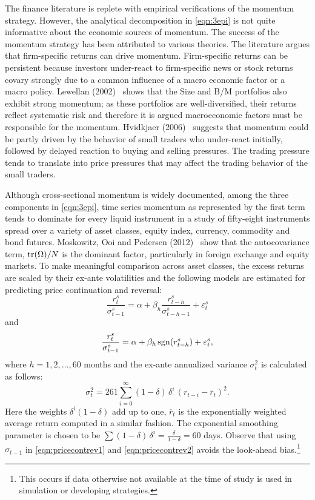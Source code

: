The finance literature is replete with empirical verifications of the momentum strategy. However, the analytical decomposition in \eqref{eqn:3epi} is not quite informative about the economic sources of momentum. The success of the momentum strategy has been attributed to various theories. The literature argues that firm-specific returns can drive momentum. Firm-specific returns can be persistent because investors under-react to firm-specific news or stock returns covary strongly due to a common influence of a macro economic factor or a macro policy. Lewellan (2002)~\cite{lew2002} shows that the Size and B/M portfolios also exhibit strong momentum; as these portfolios are well-diversified, their returns reflect systematic risk and therefore it is argued macroeconomic factors must be responsible for the momentum. Hvidkjaer (2006)~\cite{hvid2006} suggests that momentum could be partly driven by the behavior of small traders who under-react initially, followed by delayed reaction to buying and selling pressures. The trading pressure tends to translate into price pressures that may affect the trading behavior of the small traders.


Although cross-sectional momentum is widely documented, among the three components in \eqref{eqn:3epi}, time series momentum as represented by the first term tends to dominate for every liquid instrument in a study of fifty-eight instruments spread over a variety of asset classes, equity index, currency, commodity and bond futures. Moskowitz, Ooi and Pedersen (2012)~\cite{mos2012} show that the autocovariance term, $\operatorname{tr}(\Omega)/N$ is the dominant factor, particularly in foreign exchange and equity markets. To make meaningful comparison across asset classes, the excess returns are scaled by their ex-ante volatilities and the following models are estimated for predicting price continuation and reversal:
	\begin{equation} \label{eqn:pricecontrev1}
	\frac{r_t^s}{\sigma_{t-1}^s} = \alpha + \beta_h \dfrac{r_{t-h}^s}{\sigma_{t-h-1}^s} + \varepsilon_t^s
	\end{equation}
and
	\begin{equation} \label{eqn:pricecontrev2}
	\frac{r_t^s}{\sigma_{t-1}^s} = \alpha + \beta_h \sgn(r_{t-h}^s) + \varepsilon_t^s,
	\end{equation}
where $h= 1,2, \ldots, 60$ months and the ex-ante annualized variance $\sigma_t^2$ is calculated as follows:
	\begin{equation} \label{eqn:pricecontrev3}
	\sigma_t^2 = 261 \sum_{i=0}^\infty (1 - \delta)\,\delta^i \,(r_{t-i} - \overline{r}_t)^2.
	\end{equation}
Here the weights $\delta^i (1 - \delta)$ add up to one, $\overline{r}_t$ is the exponentially weighted average return computed in a similar fashion. The exponential smoothing parameter is chosen to be $\sum(1 - \delta)\, \delta^i = \frac{\delta}{1 - \delta} = 60$ days. Observe that using $\sigma_{t-1}$ in \eqref{eqn:pricecontrev1} and \eqref{eqn:pricecontrev2} avoids the look-ahead bias.\footnote{This occurs if data otherwise not available at the time of study is used in simulation or developing strategies.}


